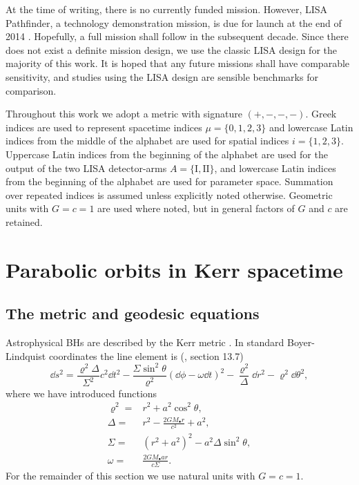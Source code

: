 At the time of writing, there is no currently funded mission. However, LISA Pathfinder, a technology demonstration mission, is due for launch at the end of 2014 \citep{Anza2005, Antonucci2012}. Hopefully, a full mission shall follow in the subsequent decade. Since there does not exist a definite mission design, we use the classic LISA design for the majority of this work. It is hoped that any future missions shall have comparable sensitivity, and studies using the LISA design are sensible benchmarks for comparison.

Throughout this work we adopt a metric with signature $(+,-,-,-)$. Greek indices are used to represent spacetime indices $\mu = \{0,1,2,3\}$ and lowercase Latin indices from the middle of the alphabet are used for spatial indices $i = \{1,2,3\}$. Uppercase Latin indices from the beginning of the alphabet are used for the output of the two LISA detector-arms $A = \{\mathrm{I}, \mathrm{II}\}$, and lowercase Latin indices from the beginning of the alphabet are used for parameter space. Summation over repeated indices is assumed unless explicitly noted otherwise. Geometric units with $G = c = 1$ are used where noted, but in general factors of $G$ and $c$ are retained.

\section{Parabolic orbits in Kerr spacetime}\label{sec:Geodesic}

\subsection{The metric and geodesic equations}

Astrophysical BHs are described by the Kerr metric \citep{Kerr1963}. In standard Boyer-Lindquist coordinates the line element is (\citealt*{Boyer1967, Hobson2006}, section 13.7)
\begin{equation}
\dd s^2 = \frac{\varrho^2 \Delta}{\Sigma^2}c^2\dd t^2 - \frac{\Sigma \sin^2 \theta}{\varrho^2}\left(\dd \phi - \omega \dd t\right)^2 - \frac{\varrho^2}{\Delta}\dd r^2 - \varrho^2\dd \theta^2,
\end{equation}
where we have introduced functions
\begin{subequations}
\begin{align}
\varrho^2 = {} & r^2 + a^2\cos^2\theta,\\
\Delta = {} & r^2 - \frac{2GM_\bullet r}{c^2} + a^2,\\
\Sigma = {} & \left(r^2 +a^2\right)^2 - a^2\Delta\sin^2\theta,\\
\omega = {} & \frac{2GM_\bullet ar}{c\Sigma}.
\end{align}
\end{subequations}
For the remainder of this section we use natural units with $G = c = 1$.

